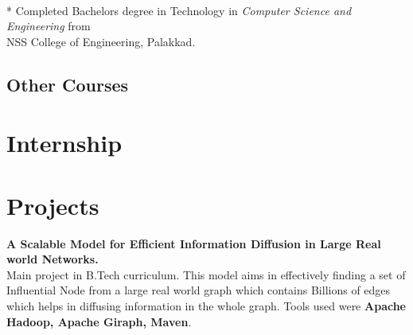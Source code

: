 \documentclass[11pt,a4paper,sans]{moderncv} %
\begin{document}
~\\

\hspace*{2cm} * Completed Bachelors degree in Technology in \textit{Computer Science and Engineering} from \\ 
\hspace*{2.3cm} NSS College of Engineering, Palakkad.
\subsection{Other Courses}




\section{Internship}



\section{Projects}

\cvlistitem
{\textbf{A Scalable Model for Efficient Information Diffusion in Large Real world Networks.}
  \\Main project in B.Tech curriculum. This model aims in effectively finding a set of Influential Node from a large real world graph which contains Billions of edges which helps in diffusing information in the whole graph. Tools used were \textbf{Apache Hadoop, Apache Giraph, Maven}. \\}
\end{document}
